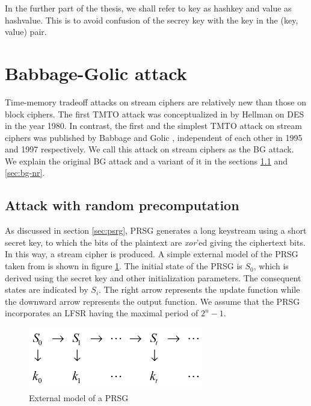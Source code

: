 In the further part of the thesis, we shall refer to key as hashkey and value as hashvalue. This is to avoid confusion of the secrey key with the key in the (key, value) pair. 

\section{Babbage-Golic attack}
\label{sec:bg-keystream-attack}

Time-memory tradeoff attacks on stream ciphers are relatively new than those on block ciphers. The first TMTO attack was conceptualized in \cite{hellman1980ctm} by Hellman on DES in the year 1980. In contrast, the first and the simplest TMTO attack on stream ciphers was published by Babbage \cite{babbage} and Golic \cite{golic}, independent of each other in 1995 and 1997 respectively. We call this attack on stream ciphers as the BG attack. We explain the original BG attack and a variant of it in the sections \ref{sec:bg-r} and \ref{sec:bg-nr}.

\subsection{Attack with random precomputation}
\label{sec:bg-r}

As discussed in section \ref{sec:psrg}, PRSG generates a long keystream using a short secret key, to which the bits of the plaintext are \emph{xor}'ed giving the ciphertext bits. In this way, a stream cipher is produced. A simple external model of the PRSG taken from \cite{babbage} is shown in figure \ref{fig:psrg-model}. The initial state of the PRSG is $S_0$, which is derived using the secret key and other initialization parameters. The consequent states are indicated by $S_i$. The right arrow represents the update function while the downward arrow represents the output function. We assume that the PRSG incorporates an LFSR having the maximal period of $2^{n} - 1$.

\begin{figure}[h]
	\centering
	\includegraphics[width=3in]{./figures/prsgmodel.png}
	\caption{External model of a PRSG}	
	\label{fig:psrg-model}
\end{figure}

